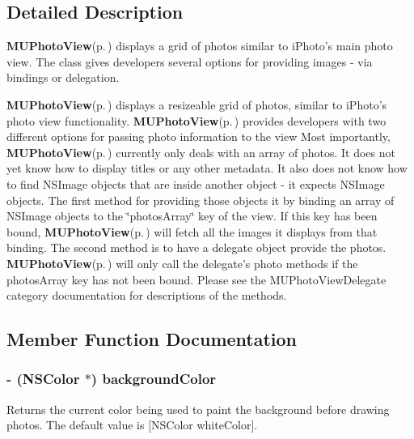 \subsection{Detailed Description}
{\bf MUPhoto\-View}{\rm (p.\,\pageref{interface_m_u_photo_view})} displays a grid of photos similar to i\-Photo's main photo view. The class gives developers several options for providing images - via bindings or delegation. 

{\bf MUPhoto\-View}{\rm (p.\,\pageref{interface_m_u_photo_view})} displays a resizeable grid of photos, similar to i\-Photo's photo view functionality. {\bf MUPhoto\-View}{\rm (p.\,\pageref{interface_m_u_photo_view})} provides developers with two different options for passing photo information to the view Most importantly, {\bf MUPhoto\-View}{\rm (p.\,\pageref{interface_m_u_photo_view})} currently only deals with an array of photos. It does not yet know how to display titles or any other metadata. It also does not know how to find NSImage objects that are inside another object - it expects NSImage objects. The first method for providing those objects it by binding an array of NSImage objects to the \char`\"{}photos\-Array\char`\"{} key of the view. If this key has been bound, {\bf MUPhoto\-View}{\rm (p.\,\pageref{interface_m_u_photo_view})} will fetch all the images it displays from that binding. The second method is to have a delegate object provide the photos. {\bf MUPhoto\-View}{\rm (p.\,\pageref{interface_m_u_photo_view})} will only call the delegate's photo methods if the photos\-Array key has not been bound. Please see the MUPhoto\-View\-Delegate category documentation for descriptions of the methods. 



\subsection{Member Function Documentation}
\subsubsection{\setlength{\rightskip}{0pt plus 5cm}- (NSColor $\ast$) background\-Color }\label{interface_m_u_photo_view_74c76236d682feceb6feb79225512959}


Returns the current color being used to paint the background before drawing photos. The default value is [NSColor white\-Color]. 
